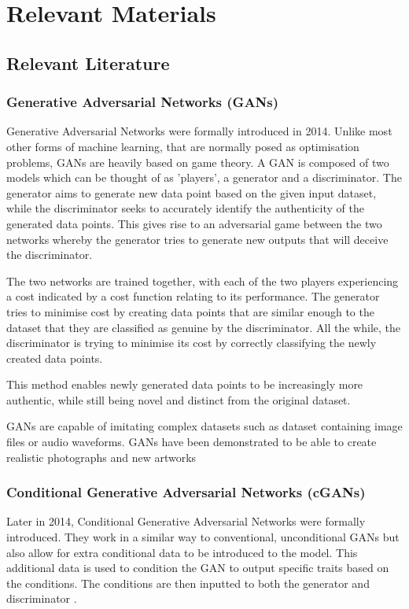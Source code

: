 \chapter{Relevant Materials}
\label{ch:2relevantmaterials}

\section{Relevant Literature}
\label{sec:relevantliterature}
\subsection{Generative Adversarial Networks (GANs)}
\label{subsec:generativeadversarialnetworks}
Generative Adversarial Networks were formally introduced in 2014. Unlike most other forms of machine learning, that are normally posed as optimisation problems, GANs are heavily based on game theory. A GAN is composed of two models which can be thought of as 'players', a generator and a discriminator. The generator aims to generate new data point based on the given input dataset, while the discriminator seeks to accurately identify the authenticity of the generated data points. This gives rise to an adversarial game between the two networks whereby the generator tries to generate new outputs that will deceive the discriminator. 

\noindent The two networks are trained together, with each of the two players experiencing a cost indicated by a cost function relating to its performance. The generator tries to minimise cost by creating data points that are similar enough to the dataset that they are classified as genuine by the discriminator. All the while, the discriminator is trying to minimise its cost by correctly classifying the newly created data points. \cite{goodfellow2020generative}

\noindent This method enables newly generated data points to be increasingly more authentic, while still being novel and distinct from the original dataset. 

\noindent GANs are capable of imitating complex datasets such as dataset containing image files or audio waveforms. GANs have been demonstrated to be able to create realistic photographs \cite{brock2019large} and new artworks
\cite{brock2019large} \cite{karras2019stylebased} \cite{artbreeder} 

\subsection{Conditional Generative Adversarial Networks (cGANs)}
\label{subsec:conditionalgenerativeadversarialnetworks}
Later in 2014, Conditional Generative Adversarial Networks were formally introduced. They work in a similar way to conventional, unconditional GANs but also allow for extra conditional data to be introduced to the model. This additional data is used to condition the GAN to output specific traits based on the conditions. The conditions are then inputted to both the generator and discriminator \cite{mirza2014conditional}.

